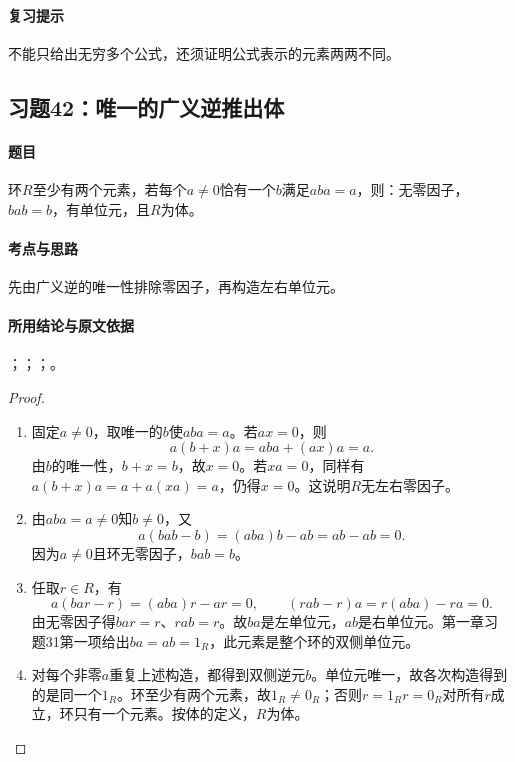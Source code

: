 \paragraph{复习提示}
不能只给出无穷多个公式，还须证明公式表示的元素两两不同。


\subsection{习题42：\texorpdfstring{唯一的广义逆推出体}{唯一的广义逆推出体}}
\label{ex:1:42}

\paragraph{题目}
环$R$至少有两个元素，若每个$a\neq0$恰有一个$b$满足$aba=a$，则：无零因子，$bab=b$，有单位元，且$R$为体。

\paragraph{考点与思路}
先由广义逆的唯一性排除零因子，再构造左右单位元。

\paragraph{所用结论与原文依据}
；；；。


\begin{proof}
\begin{enumerate}
\item 固定$a\ne0$，取唯一的$b$使$aba=a$。若$ax=0$，则
\[
a(b+x)a=aba+(ax)a=a.
\]
由$b$的唯一性，$b+x=b$，故$x=0$。若$xa=0$，同样有$a(b+x)a=a+a(xa)=a$，仍得$x=0$。这说明$R$无左右零因子。

\item 由$aba=a\ne0$知$b\ne0$，又
\[
a(bab-b)=(aba)b-ab=ab-ab=0.
\]
因为$a\ne0$且环无零因子，$bab=b$。

\item 任取$r\in R$，有
\[
a(bar-r)=(aba)r-ar=0,\qquad
(rab-r)a=r(aba)-ra=0.
\]
由无零因子得$bar=r$、$rab=r$。故$ba$是左单位元，$ab$是右单位元。第一章习题31第一项给出$ba=ab=1_R$，此元素是整个环的双侧单位元。

\item 对每个非零$a$重复上述构造，都得到双侧逆元$b$。单位元唯一，故各次构造得到的是同一个$1_R$。环至少有两个元素，故$1_R\ne0_R$；否则$r=1_Rr=0_R$对所有$r$成立，环只有一个元素。按体的定义，$R$为体。
\end{enumerate}
\end{proof}

